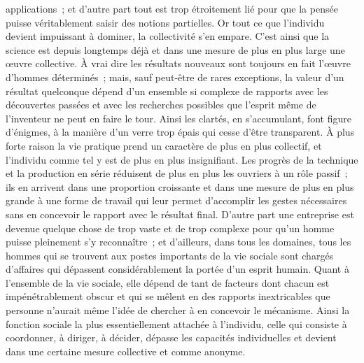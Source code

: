 \documentclass[french,twoside]{book} %
\begin{document}
applications ; et d'autre part tout est trop étroitement lié pour que la pensée puisse véritablement saisir des notions partielles. Or tout ce que l'individu devient impuissant à dominer, la collectivité s'en empare. C'est ainsi que la science est depuis longtemps déjà et dans une mesure de plus en plus large une œuvre collective. À vrai dire les résultats nouveaux sont toujours en fait l'œuvre d'hommes déterminés ; mais, sauf peut-être de rares exceptions, la valeur d'un résultat quelconque dépend d'un ensemble si complexe de rapports avec les découvertes passées et avec les recherches possibles que l'esprit même de l'inventeur ne peut en faire le tour. Ainsi les clartés, en s'accumulant, font figure d'énigmes, à la manière d'un verre trop épais qui cesse d'être transparent. À plus forte raison la vie pratique prend un caractère de plus en plus collectif, et l’individu comme tel y est de plus en plus insignifiant. Les progrès de la technique et la production en série réduisent de plus en plus les ouvriers à un rôle passif ; ils en arrivent dans une proportion croissante et dans une mesure de plus en plus grande à une forme de travail qui leur permet d'accomplir les gestes nécessaires sans en concevoir le rapport avec le résultat final. D'autre part une entreprise est devenue quelque chose de trop vaste et de trop complexe pour qu'un homme puisse pleinement s'y reconnaître ; et d'ailleurs, dans tous les domaines, tous les hommes qui se trouvent aux postes importants de la vie sociale sont chargés d'affaires qui dépassent considérablement la portée d'un esprit humain. Quant à l'ensemble de la vie sociale, elle dépend de tant de facteurs dont chacun est impénétrablement obscur et qui se mêlent en des rapports inextricables que personne n'aurait même l'idée de chercher à en concevoir le mécanisme. Ainsi la fonction sociale la plus essentiellement attachée à l'individu, celle qui consiste à coordonner, à diriger, à décider, dépasse les capacités individuelles et devient dans une certaine mesure collective et comme anonyme.\par
\end{document}
